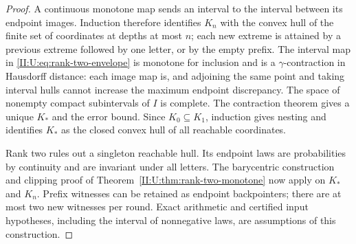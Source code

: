 \begin{proof}
A continuous monotone map sends an interval to the interval between
its endpoint images. Induction therefore identifies $K_n$ with the
convex hull of the finite set of coordinates at depths at most $n$;
each new extreme is attained by a previous extreme followed by one
letter, or by the empty prefix. The interval map in
\eqref{II:U:eq:rank-two-envelope} is monotone for inclusion and is a
$\gamma$-contraction in Hausdorff distance: each image map is, and
adjoining the same point and taking interval hulls cannot increase the
maximum endpoint discrepancy. The space of nonempty compact
subintervals of $I$ is complete. The contraction theorem gives a
unique $K_*$ and the error bound. Since $K_0\subseteq K_1$, induction
gives nesting and identifies $K_*$ as the closed convex hull of all
reachable coordinates.

Rank two rules out a singleton reachable hull. Its endpoint laws are
probabilities by continuity and are invariant under all letters.
The barycentric construction and clipping proof of
Theorem~\ref{II:U:thm:rank-two-monotone} now apply on $K_*$ and $K_n$.
Prefix witnesses can be retained as endpoint backpointers; there are
at most two new witnesses per round. Exact arithmetic and certified
input hypotheses, including the interval of nonnegative laws, are
assumptions of this construction.
\end{proof}
